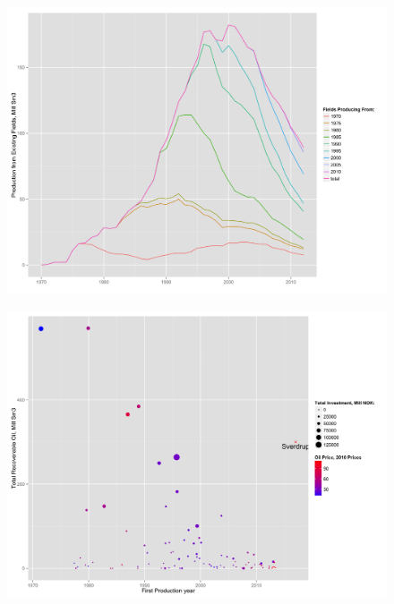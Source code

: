 \documentclass{beamer}
\begin{document}

\begin{frame}[plain]
	\begin{figure}
	\includegraphics[width=1\textwidth]{tot_exist_prod_cf.png}
	\end{figure}
\end{frame}


\begin{frame}[plain]
	\begin{figure}
	\includegraphics[width=1\textwidth]{size_vs_init_prod.png}
	\end{figure}
\end{frame}
\end{document}
